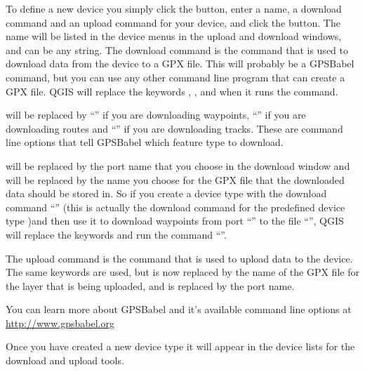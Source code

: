 To define a new device you simply click the  button, enter a name, a download command and an upload command for your device, and click the  button.
The name will be listed in the device menus in the upload and download windows, and can be any string.
The download command is the command that is used to download data from the device to a GPX file.
This will probably be a GPSBabel command, but you can use any other command line program that can create a GPX file.
QGIS will replace the keywords , , and  when it runs the command.

 will be replaced by {}``'' if you are downloading waypoints, {}``'' if you are downloading routes and {}``'' if you are downloading tracks.
These are command line options that tell GPSBabel which feature type to download.

 will be replaced by the port name that you choose in the download window and  will be replaced by the name you choose for the GPX file that the downloaded data should be stored in.
So if you create a device type with the download command {}``'' (this is actually the download command for the predefined device type )and then use it to download waypoints from port {}``'' to the file {}``'', QGIS will replace the keywords and run the command {}``''.

The upload command is the command that is used to upload data to the device.
The same keywords are used, but  is now replaced by the name of the GPX file for the layer that is being uploaded, and  is replaced by the port name.

You can learn more about GPSBabel and it's available command line options at \url{http://www.gpsbabel.org}

Once you have created a new device type it will appear in the device lists for the download and upload tools.

\FloatBarrier
